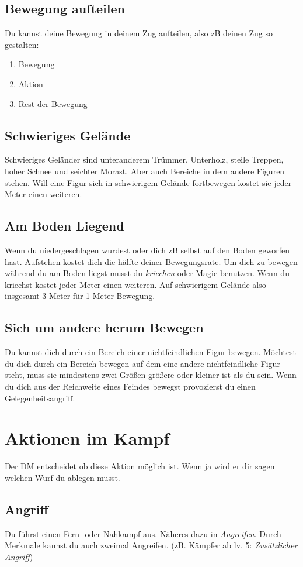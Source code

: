 \subsection{Bewegung aufteilen}
Du kannst deine Bewegung in deinem Zug aufteilen, also zB deinen Zug so gestalten:
\begin{enumerate}
  \item Bewegung
  \item Aktion
  \item Rest der Bewegung
\end{enumerate}

\subsection{Schwieriges Gelände}
Schwieriges Geländer sind unteranderem Trümmer, Unterholz, steile Treppen, hoher Schnee und seichter Morast. Aber auch Bereiche in dem andere Figuren stehen. Will eine Figur sich in schwierigem Gelände fortbewegen kostet sie jeder Meter einen weiteren.

\subsection{Am Boden Liegend}
Wenn du niedergeschlagen wurdest oder dich zB selbst auf den Boden geworfen hast. Aufstehen kostet dich die hälfte deiner Bewegungsrate. Um dich zu bewegen während du am Boden liegst musst du \textit{kriechen} oder Magie benutzen. Wenn du kriechst kostet jeder Meter einen weiteren. Auf schwierigem Gelände also insgesamt 3 Meter für 1 Meter Bewegung.

\subsection{Sich um andere herum Bewegen}
Du kannst dich durch ein Bereich einer nichtfeindlichen Figur bewegen. Möchtest du dich durch ein Bereich bewegen auf dem eine andere nichtfeindliche Figur steht, muss sie mindestens zwei Größen größere oder kleiner ist als du sein.
Wenn du dich aus der Reichweite eines Feindes bewegst provozierst du einen Gelegenheitsangriff.

\section{Aktionen im Kampf}
Der DM entscheidet ob diese Aktion möglich ist. Wenn ja wird er dir sagen welchen Wurf du ablegen musst.

\subsection{Angriff}
Du führst einen Fern- oder Nahkampf aus. Näheres dazu in \textit{Angreifen}. Durch Merkmale kannst du auch zweimal Angreifen. (zB. Kämpfer ab lv. 5: \textit{Zusätzlicher Angriff})

